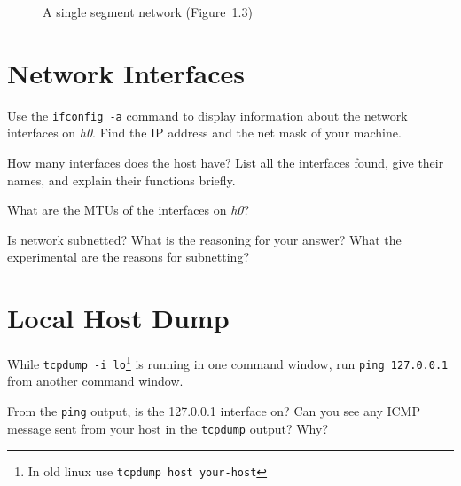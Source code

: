 \documentclass{../UTNetLab}
\begin{document}
\begin{center}
\begin{minipage}{0.48\textwidth}
\begin{flushright}
\begin{figure}[H]
                    \caption{A single segment network (Figure~1.3)}\label{fig:1.3}
                \end{figure}
            \end{flushright}
        \end{minipage}
    \end{center}

\section{Network Interfaces}
    Use the \lstinline{ifconfig -a} command to display information about the network interfaces on \textit{h0}.
    Find the IP address and the net mask of your machine.
    
    \begin{report}
        \item How many interfaces does the host have?
            List all the interfaces found, give their names, and explain their functions briefly.

        \item What are the MTUs of the interfaces on \textit{h0}?

        \item Is network subnetted?
            What is the reasoning for your answer? What the experimental are the reasons for subnetting?
    \end{report}


\section{Local Host Dump}
    While \lstinline[emph={lo}]{tcpdump -i lo}\footnote{In old linux use \lstinline[emph={your-host}]{tcpdump host your-host}} is running in one command window, run \lstinline{ping 127.0.0.1} from another command window.

    \begin{report}
        \item From the \lstinline{ping} output, is the 127.0.0.1 interface on?
            Can you see any ICMP message sent from your host in the \lstinline{tcpdump} output?
            Why?
    \end{report}
\end{document}
